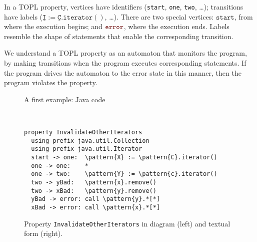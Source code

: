 \documentclass[10pt, preprint]{sigplanconf} %
\newcommand{\error}{\ensuremath{\textcolor{darkred}{\mathtt{error}}}\xspace}
\newcommand{\pattern}[1]{\ensuremath{\mathtt{\underline{#1}}}}
\newcommand{\start}{\ensuremath{\mathtt{start}}\xspace}
\begin{document}
In a TOPL property, vertices have identifiers (\texttt{start}, \texttt{one}, \texttt{two}, \dots);
transitions have labels ($\pattern I:=\pattern C.\mathtt{iterator}()$, \dots).
There are two special vertices: \start, from where the execution begins; and \error, where the execution ends.
Labels resemble the shape of statements that enable the corresponding transition.

We understand a TOPL property as an automaton that monitors the
program, by making transitions when the program executes corresponding
statements. If the program drives the automaton to the error state in
this manner, then the program violates the property.

\begin{figure}[t] %

\caption{A first example: Java code}
\label{fig:first.java}
\end{figure}
%
\begin{figure}[t]
\\[2ex]
\begin{Verbatim}[commandchars=\\\{\}]
property InvalidateOtherIterators
  using prefix java.util.Collection
  using prefix java.util.Iterator
  start -> one:  \pattern{X} := \pattern{C}.iterator()
  one -> one:    *
  one -> two:    \pattern{Y} := \pattern{c}.iterator()
  two -> yBad:   \pattern{x}.remove()
  two -> xBad:   \pattern{y}.remove()
  yBad -> error: call \pattern{y}.*[*]
  xBad -> error: call \pattern{x}.*[*]
\end{Verbatim}
\caption{Property {\tt InvalidateOtherIterators} in diagram (left) and textual form (right).
}
\label{fig:first.topl}
\end{figure}
\end{document}
